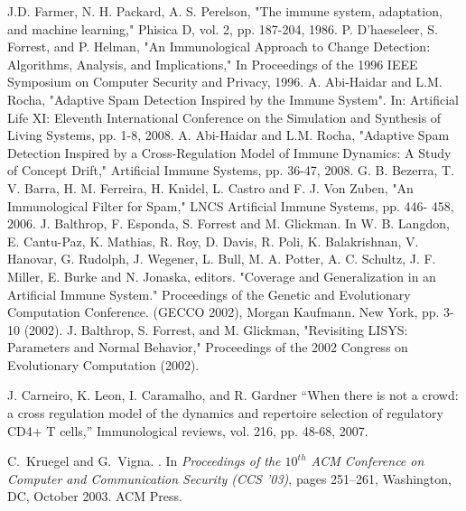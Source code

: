 \documentclass{llncs}
\begin{document}
\begin{thebibliography}{99.}
 J.D. Farmer, N. H. Packard, A. S. Perelson, "The immune system, adaptation, and machine learning," Phisica D, vol. 2, pp. 187-204, 1986. 
 P. D'haeseleer, S. Forrest, and P. Helman, "An Immunological Approach to Change Detection: Algorithms, Analysis, and Implications,"  In Proceedings of the 1996 IEEE Symposium on Computer Security and Privacy, 1996.
 A. Abi-Haidar and L.M. Rocha,  "Adaptive Spam Detection Inspired by the Immune System". In:  Artificial Life XI: Eleventh International Conference on the Simulation and Synthesis of Living Systems, pp. 1-8, 2008.
 A. Abi-Haidar and L.M. Rocha, "Adaptive Spam Detection Inspired by a Cross-Regulation Model of Immune Dynamics: A Study of Concept Drift," 	Artificial Immune Systems, pp. 36-47, 2008.
 G. B. Bezerra, T. V. Barra, H. M. Ferreira, H. Knidel, L.  Castro and F. J. Von Zuben, "An Immunological Filter for Spam," LNCS 	Artificial Immune Systems, pp. 446- 458, 2006. 
 J. Balthrop, F. Esponda, S. Forrest and M. Glickman. In W. B. Langdon, E. Cantu-Paz, K. Mathias, R. Roy, D. Davis, R. Poli, K. Balakrishnan, V. Hanovar, G. Rudolph, J. Wegener, L. Bull, M. A. Potter, A. C. Schultz, J. F. Miller, E. Burke and N. Jonaska, editors. "Coverage and Generalization in an Artificial Immune System." Proceedings of the Genetic and Evolutionary Computation Conference. (GECCO 2002), Morgan Kaufmann. New York, pp. 3-10 (2002).
  J. Balthrop, S. Forrest, and M. Glickman, "Revisiting LISYS: Parameters and Normal Behavior," Proceedings of the 2002 Congress on Evolutionary Computation  (2002).

 J. Carneiro, K. Leon, I. Caramalho, and R. Gardner “When there is not a crowd: a cross regulation model of the dynamics and repertoire selection of regulatory CD4+ T cells,” Immunological reviews, vol. 216, pp. 48-68, 2007.

C.~Kruegel and G.~Vigna.
.
\newblock In {\em Proceedings of the $10^{th}$ ACM Conference on Computer and
  Communication Security (CCS '03)}, pages 251--261, Washington, DC, October
  2003. ACM Press.
\end{thebibliography}

\end{document}
